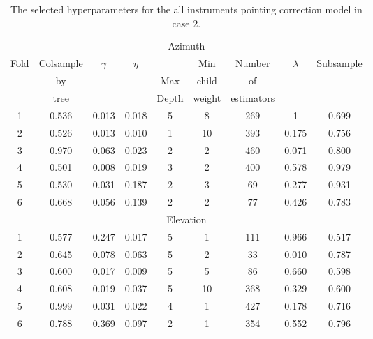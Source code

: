 \begin{table}[!htbp]
    \centering
    \caption{The selected hyperparameters for the all instruments pointing correction model in case 2.}
    \begin{tabular}{ccccccccc}
        \toprule
        \multicolumn{9}{c}{Azimuth} \\
        \multirow{3}{*}{Fold} &  Colsample &  \multirow{3}{*}{$\gamma$} &  \multirow{3}{*}{$\eta$} &   &  Min &  Number &  \multirow{3}{*}{$\lambda$} &  \multirow{3}{*}{Subsample} \\
         & by   & & & Max   & child  & of         & & \\
         & tree & & & Depth & weight & estimators & & \\
        \midrule
        1 &   0.536 &  0.013 &          0.018 &      5 &             8 &       269 &       1 &      0.699 \\
        2 &   0.526 &  0.013 &          0.010 &      1 &            10 &       393 &       0.175 &      0.756 \\
        3 &   0.970 &  0.063 &          0.023 &      2 &             2 &       460 &       0.071 &      0.800 \\
        4 &   0.501 &  0.008 &          0.019 &      3 &             2 &       400 &       0.578 &      0.979 \\
        5 &   0.530 &  0.031 &          0.187 &      2 &             3 &        69 &       0.277 &      0.931 \\
        6 &   0.668 &  0.056 &          0.139 &      2 &             2 &        77 &       0.426 &      0.783 \\
        \cmidrule{1-9}
        \multicolumn{9}{c}{Elevation} \\
        \cmidrule{1-9}
        1 &   0.577 &  0.247 &          0.017 &      5 &             1 &       111 &       0.966 &      0.517 \\
        2 &   0.645 &  0.078 &          0.063 &      5 &             2 &        33 &       0.010 &      0.787 \\
        3 &   0.600 &  0.017 &          0.009 &      5 &             5 &        86 &       0.660 &      0.598 \\
        4 &   0.608 &  0.019 &          0.037 &      5 &            10 &       368 &       0.329 &      0.600 \\
        5 &   0.999 &  0.031 &          0.022 &      4 &             1 &       427 &       0.178 &      0.716 \\
        6 &   0.788 &  0.369 &          0.097 &      2 &             1 &       354 &       0.552 &      0.796 \\
        \bottomrule
        \end{tabular}
        \label{tab:hyperparameters_all_instruments_case2}
\end{table}

